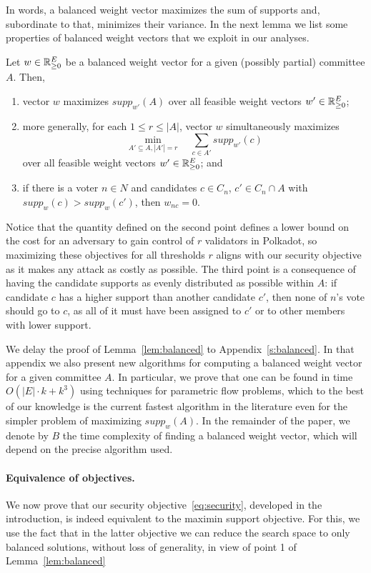In words, a balanced weight vector maximizes the sum of supports and, subordinate to that, minimizes their variance. 
In the next lemma we list some properties of balanced weight vectors that we exploit in our analyses.

\begin{lemma}\label{lem:balanced}
Let $w\in\mathbb{R}_{\geq 0}^E$ be a balanced weight vector for a given (possibly partial) committee $A$. Then,
\begin{enumerate}
    \item vector $w$ maximizes $supp_{w'}(A)$ over all feasible weight vectors $w'\in\mathbb{R}_{\geq 0}^E$; 
    \item more generally, for each $1\leq r\leq |A|$, vector $w$ simultaneously maximizes 
    $$\min_{A'\subseteq A, |A'|=r} \quad \sum_{c\in A'} supp_{w'}(c)$$
over all feasible weight vectors $w'\in\mathbb{R}_{\geq 0}^E$; and
    \item if there is a voter $n\in N$ and candidates $c\in C_n$, $c'\in C_n\cap A$ with $supp_w(c)>supp_w(c')$, then $w_{nc}=0$.
\end{enumerate}
\end{lemma}

Notice that the quantity defined on the second point defines a lower bound on the cost for an adversary to gain control of $r$ validators in Polkadot, so maximizing these objectives for all thresholds $r$ aligns with our security objective as it makes any attack as costly as possible. 
The third point is a consequence of having the candidate supports as evenly distributed as possible within $A$: if candidate $c$ has a higher support than another candidate $c'$, then none of $n$'s vote should go to $c$, as all of it must have been assigned to $c'$ or to other members with lower support. 

We delay the proof of Lemma~\ref{lem:balanced} to Appendix~\ref{s:balanced}. 
In that appendix we also present new algorithms for computing a balanced weight vector for a given committee $A$. 
In particular, we prove that one can be found in time $O(|E|\cdot k + k^3)$ using techniques for parametric flow problems, which to the best of our knowledge is the current fastest algorithm in the literature even for the simpler problem of maximizing $supp_w(A)$.
In the remainder of the paper, we denote by $B$ the time complexity of finding a balanced weight vector, which will depend on the precise algorithm used.

\paragraph{Equivalence of objectives.} 
We now prove that our security objective~\eqref{eq:security}, developed in the introduction, is indeed equivalent to the maximin support objective. For this, we use the fact that in the latter objective we can reduce the search space to only balanced solutions, without loss of generality, in view of point 1 of Lemma~\ref{lem:balanced}

